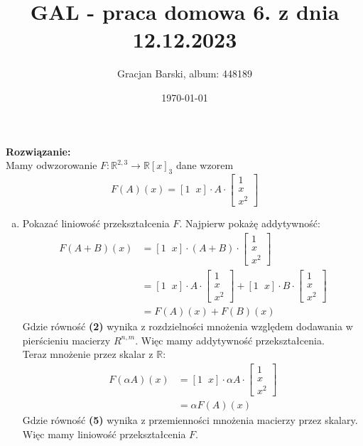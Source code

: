 \documentclass[10pt]{article}
\title{GAL - praca domowa 6. z dnia 12.12.2023}
\author{Gracjan Barski, album: 448189}
\date{\today}
\newcommand{\R}{\mathbb{R}}
\begin{document}
\maketitle
\textbf{Rozwiązanie:} \\[10pt]
Mamy odwzorowanie $F \colon \R^{2,3} \to \R[x]_3$ dane wzorem
$$F(A)(x) = [1 \hspace{7pt} x] \cdot A \cdot \begin{bmatrix}
    1 \\
    x \\
    x^2
\end{bmatrix}$$
\begin{enumerate}[(a)]
    \item Pokazać liniowość przekształcenia $F$. Najpierw pokażę addytywność:
    \begin{align}
        F(A + B)(x) &= [1 \hspace{7pt} x] \cdot (A + B) \cdot \begin{bmatrix}
        1 \\
        x \\
        x^2
        \end{bmatrix} \\
        &= [1 \hspace{7pt} x] \cdot A \cdot \begin{bmatrix}
    1 \\
    x \\
    x^2
    \end{bmatrix} + [1 \hspace{7pt} x] \cdot B \cdot \begin{bmatrix}
        1 \\
        x \\
        x^2
    \end{bmatrix} \\
    &= F(A)(x) + F(B)(x)
    \end{align}
    Gdzie równość \textbf{(2)} wynika z rozdzielności mnożenia względem dodawania w pierścieniu macierzy $R^{n,m}$. Więc mamy addytywność przekształcenia. \\[5pt]
    Teraz mnożenie przez skalar z $\R$:
    \begin{align}
        F(\alpha A)(x) &= [1 \hspace{7pt} x] \cdot \alpha A \cdot \begin{bmatrix}
    1 \\
    x \\
    x^2
    \end{bmatrix} \\
    &= \alpha F(A)(x)
    \end{align}
    Gdzie równość \textbf{(5)} wynika z przemienności mnożenia macierzy przez skalary. Więc mamy liniowość przekształcenia $F$.


\end{enumerate}
\end{document}

